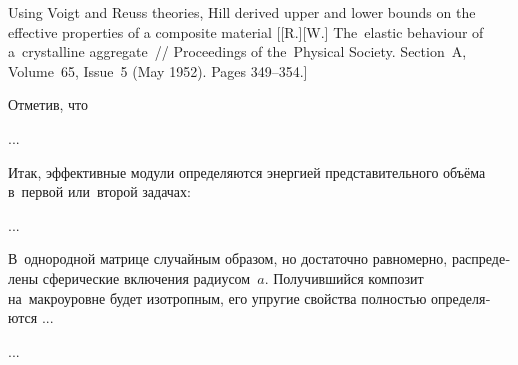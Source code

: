 \begin{otherlanguage}{russian}

{\small \noindent Using Voigt and Reuss theories, Hill derived upper and lower bounds on the effective properties of a composite material [[R.][W.] The~elastic behaviour of a~crystalline aggregate~// Proceedings of the~Physical Society. Section~A, Volume~65, Issue~5 (May 1952). Pages 349\hbox{--}354.]
\par}

Отметив, что

...



\end{otherlanguage}



\begin{otherlanguage}{russian}

Итак, эффективные модули определяются энергией представительного объёма в~первой или~второй задачах:

...



\end{otherlanguage}



\begin{otherlanguage}{russian}

В~однородной матрице случайным образом, но достаточно равномерно, распределены сферические включения радиусом~$a$. Получившийся композит на~макроуровне будет изотропным, его упругие свойства полностью определяются ...

...



\end{otherlanguage}


